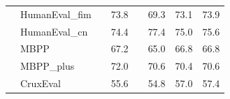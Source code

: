 \begin{table}[h]
\begin{tabular}{clllllll}
                                               & HumanEval\_fim         &  & 73.8                                     &  & 69.3   & 73.1  & 73.9   \\
                                               & HumanEval\_cn  &  & 74.4                                     &  & 77.4   & 75.0  & 75.6   \\
                                               & MBPP                   &  & 67.2                                     &  & 65.0   & 66.8  & 66.8   \\
                                               & MBPP\_plus             &  & 72.0                                     &  & 70.6   & 70.4  & 70.6   \\
                                               & CruxEval               &  & 55.6                                     &  & 54.8   & 57.0  & 57.4  \\
\bottomrule
\end{tabular}
\end{table}




